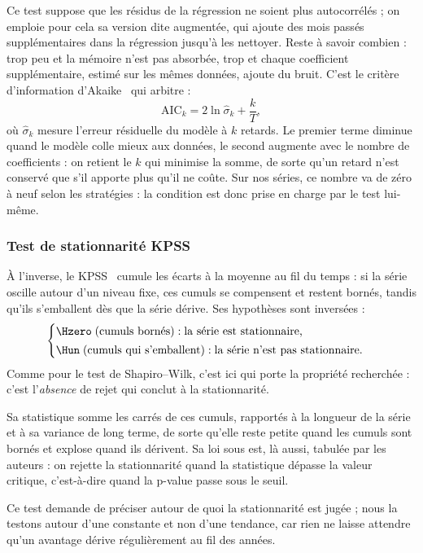 Ce test suppose que les résidus de la régression ne soient
plus autocorrélés ; on emploie pour cela sa version dite augmentée, qui
ajoute des mois passés supplémentaires dans la régression jusqu'à les
nettoyer. Reste à savoir combien : trop peu et la mémoire n'est pas absorbée,
trop et chaque coefficient supplémentaire, estimé sur les mêmes données,
ajoute du bruit. C'est le critère d'information d'Akaike~\cite{akaike1974}
qui arbitre :
\[
  \mathrm{AIC}_k = 2\ln \hat\sigma_k + \frac{k}{T},
\]
où \(\hat\sigma_k\) mesure l'erreur résiduelle du modèle à \(k\) retards.
Le premier terme diminue quand le modèle colle mieux aux données, le second
augmente avec le nombre de coefficients : on retient le \(k\) qui minimise
la somme, de sorte qu'un retard n'est conservé que s'il apporte plus qu'il
ne coûte. Sur nos séries, ce nombre va de zéro à neuf selon les stratégies :
la condition est donc prise en charge par le test lui-même.

\subsubsection*{Test de stationnarité KPSS}

À l'inverse, le KPSS~\cite{kpss1992} cumule les écarts à la moyenne au fil du temps : si la
série oscille autour d'un niveau fixe, ces cumuls se compensent et restent
bornés, tandis qu'ils s'emballent dès que la série dérive. Ses hypothèses
sont inversées :
\[
  \begin{cases}
    \Hzero \;(\text{cumuls bornés}) : \text{la série est stationnaire,}\\[2pt]
    \Hun \;(\text{cumuls qui s'emballent}) : \text{la série n'est pas stationnaire.}
  \end{cases}
\]
Comme pour le test de Shapiro--Wilk, c'est ici \Hzero{} qui porte la propriété
recherchée : c'est l'\emph{absence} de rejet qui conclut à la stationnarité.

Sa statistique somme les carrés de ces cumuls, rapportés à la longueur de la
série et à sa variance de long terme, de sorte qu'elle reste petite quand les
cumuls sont bornés et explose quand ils dérivent. Sa loi sous \Hzero{} est,
là aussi, tabulée par les auteurs : on rejette la stationnarité quand la
statistique dépasse la valeur critique, c'est-à-dire quand la p-value passe
sous le seuil.

Ce test demande de préciser autour de quoi la stationnarité est jugée ; nous
la testons autour d'une constante et non d'une tendance, car rien ne laisse
attendre qu'un avantage dérive régulièrement au fil des années.

